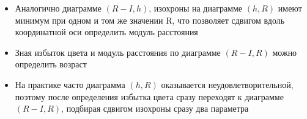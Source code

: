 \documentclass{beamer}
\begin{document}
    \begin{frame}
        \begin{itemize}
        \item Аналогично диаграмме $\left(R-I, h\right)$, изохроны на диаграмме $\left(h, R\right)$ имеют минимум при одном и том же значении R, 
        что позволяет сдвигом вдоль координатной оси определить модуль расстояния
        \item Зная избыток цвета и модуль расстояния по диаграмме $\left(R-I, R\right)$ можно определить возраст
        \item На практике часто диаграмма $\left(h, R\right)$ оказывается неудовлетворительной, поэтому после определения избытка цвета
        сразу переходят к диаграмме $\left(R-I, R\right)$, подбирая сдвигом изохроны сразу два параметра
        \end{itemize}
    \end{frame}
\end{document}
